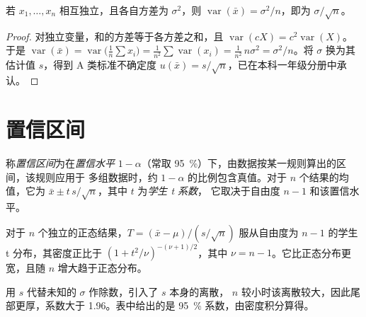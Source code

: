\begin{theorem}[平均值的方差]\label{thm:b2:measurement-statistics:mean-variance}
若 $x_1, \dots, x_n$ 相互独立，且各自方差为 $\sigma^2$，则 $\operatorname{var}(\bar x) =
\sigma^2/n$，即为 $\sigma/\sqrt n$。
\end{theorem}

\begin{proof}
对独立变量，和的方差等于各方差之和，且
$\operatorname{var}(cX) = c^2\operatorname{var}(X)$。于是 $\operatorname{var}(\bar x) =
\operatorname{var}\bigl(\tfrac1n\sum x_i\bigr) = \tfrac{1}{n^2}\sum\operatorname{var}(x_i) =
\tfrac{1}{n^2}\,n\sigma^2 = \sigma^2/n$。将 $\sigma$ 换为其估计值 $s$，得到
A 类标准不确定度 $u(\bar x) = s/\sqrt n$，已在本科一年级分册中承认。
\end{proof}

\section{置信区间}

\begin{definition}[置信区间]\label{def:b2:measurement-statistics:confidence}
称\emph{置信区间}为在\emph{置信水平}
$1 - \alpha$（常取 95~\%）下，由数据按某一规则算出的区间，该规则应用于
多组数据时，约 $1 - \alpha$ 的比例包含真值。对于 $n$ 个结果的均值，它为
$\bar x \pm t\,s/\sqrt n$，其中 $t$ 为\emph{学生 t 系数}，
它取决于自由度 $n - 1$ 和该置信水平。
\end{definition}

\begin{proposition}[学生 t 分布]\label{prop:b2:measurement-statistics:student}
对于 $n$ 个独立的正态结果，$T = (\bar x - \mu)/(s/\sqrt n)$ 服从自由度为
$n - 1$ 的学生 t 分布，其密度正比于 $(1 + t^2/\nu)^{-(\nu+1)/2}$，其中
$\nu = n - 1$。它比正态分布更宽，且随 $n$ 增大趋于正态分布。
\end{proposition}

\admitted

用 $s$ 代替未知的 $\sigma$ 作除数，引入了 $s$ 本身的离散，
$n$ 较小时该离散较大，因此尾部更厚，系数大于 1.96。表中给出的是 95~\%
系数，由密度积分算得。

